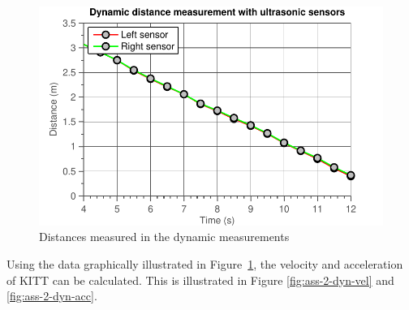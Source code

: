 \documentclass[11pt,titlepage]{report}
\begin{document}
\begin{figure}[H]
	\begin{center}
		\includegraphics[width=0.6\linewidth]{resource/distance-rc.pdf}
	\end{center}
	\caption{Distances measured in the dynamic measurements}
	\label{fig:ass-2-dyn-dist}
\end{figure}

Using the data graphically illustrated in Figure~\ref{fig:ass-2-dyn-dist}, the velocity and acceleration of KITT can be calculated. This is illustrated in Figure \ref{fig:ass-2-dyn-vel} and \ref{fig:ass-2-dyn-acc}.
\end{document}
